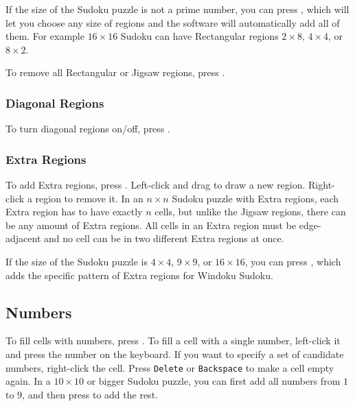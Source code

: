 If the size of the Sudoku puzzle is not a prime number, you can press ,
which will let you choose any size of regions and the software will automatically add all of them.
For example $16 \times 16$ Sudoku can have Rectangular regions $2 \times 8$, $4 \times 4$, or $8 \times 2$.

To remove all Rectangular or Jigsaw regions, press .


\subsubsection*{Diagonal Regions}

To turn diagonal regions on/off, press .


\subsubsection*{Extra Regions}

To add Extra regions, press .
Left-click and drag to draw a new region.
Right-click a region to remove it.
In an $n \times n$ Sudoku puzzle with Extra regions, each Extra region has to have exactly $n$ cells, but
unlike the Jigsaw regions, there can be any amount of Extra regions.
All cells in an Extra region must be edge-adjacent and no cell can be in two different Extra regions at once.

If the size of the Sudoku puzzle is $4 \times 4$, $9 \times 9$, or $16 \times 16$,
you can press , which adds the specific pattern of Extra regions for Windoku Sudoku.


\subsection*{Numbers}

To fill cells with numbers, press .
To fill a cell with a single number, left-click it and press the number on the keyboard.
If you want to specify a set of candidate numbers, right-click the cell.
Press \texttt{Delete} or \texttt{Backspace} to make a cell empty again.
In a $10 \times 10$ or bigger Sudoku puzzle, you can first add all numbers from $1$ to $9$,
and then press  to add the rest.

